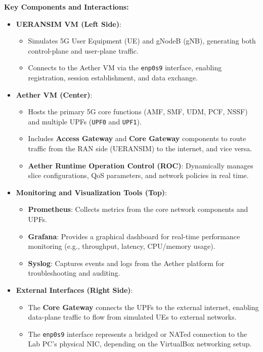 \textbf{Key Components and Interactions:}
\begin{itemize}
    \item \textbf{UERANSIM VM (Left Side)}:
    \begin{itemize}
        \item Simulates 5G User Equipment (UE) and gNodeB (gNB), generating both control-plane and user-plane traffic.
        \item Connects to the Aether VM via the \texttt{enp0s9} interface, enabling registration, session establishment, and data exchange.
    \end{itemize}
    \item \textbf{Aether VM (Center)}:
    \begin{itemize}
        \item Hosts the primary 5G core functions (AMF, SMF, UDM, PCF, NSSF) and multiple UPFs (\texttt{UPF0} and \texttt{UPF1}).
        \item Includes \textbf{Access Gateway} and \textbf{Core Gateway} components to route traffic from the RAN side (UERANSIM) to the internet, and vice versa.
        \item \textbf{Aether Runtime Operation Control (ROC)}: Dynamically manages slice configurations, QoS parameters, and network policies in real time.
    \end{itemize}
    \item \textbf{Monitoring and Visualization Tools (Top)}:
    \begin{itemize}
        \item \textbf{Prometheus}: Collects metrics from the core network components and UPFs.
        \item \textbf{Grafana}: Provides a graphical dashboard for real-time performance monitoring (e.g., throughput, latency, CPU/memory usage).
        \item \textbf{Syslog}: Captures events and logs from the Aether platform for troubleshooting and auditing.
    \end{itemize}
    \item \textbf{External Interfaces (Right Side)}:
    \begin{itemize}
        \item The \textbf{Core Gateway} connects the UPFs to the external internet, enabling data-plane traffic to flow from simulated UEs to external networks.
        \item The \texttt{enp0s9} interface represents a bridged or NATed connection to the Lab PC’s physical NIC, depending on the VirtualBox networking setup.
    \end{itemize}
\end{itemize}

